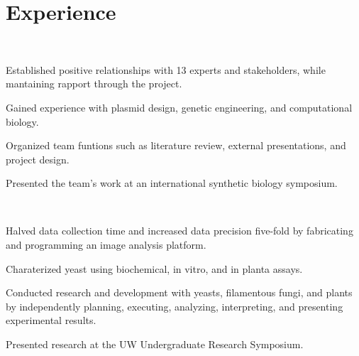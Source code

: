 \documentclass[]{forrest-resume-interfont}
\begin{document}
\linesep


\section{ Experience}
\\

\begin{tightemize}
    \item Established positive relationships with 13 experts and stakeholders, while mantaining rapport through the project.
    \item Gained experience with plasmid design, genetic engineering, and computational biology.
    \item Organized team funtions such as literature review, external presentations, and project design.
    \item Presented the team's work at an international synthetic biology symposium.
\end{tightemize}


\spacesep


\\

\begin{tightemize}
    \item Halved data collection time and increased data precision five-fold by fabricating and programming an image analysis platform.
    \item Charaterized yeast using biochemical, in vitro, and in planta assays.
    \item Conducted research and development with yeasts, filamentous fungi, and plants by independently planning, executing, analyzing, interpreting, and presenting experimental results. 
    \item Presented research at the UW Undergraduate Research Symposium.
\end{tightemize}
\linesep
\end{document}
